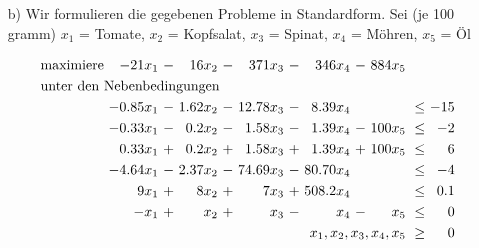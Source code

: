 \documentclass [a4paper,11pt]{article}
\begin{document}
\begin{enumerate}
\begin{enumerate}
				\item[b)]
					Wir formulieren die gegebenen Probleme in Standardform.
                    Sei (je 100 gramm) $x_1$ = Tomate, $x_2$ = Kopfsalat, $x_3$ = Spinat, $x_4$ = Möhren, $x_5$ = Öl
                            


                    \begin{align*}
                    \begin{alignedat}{7}
                    & \text{maximiere } & -21x_1 &\ - &\ 16x_2 &\ - &\ 371x_3 &\ - &\ 346x_4 &\ - &\ 884x_5 & & \\
                    & \rlap{unter den Nebenbedingungen} & & & & & & & & & & & \\
                    &&-0.85x_1 &\ - &\ 1.62x_2 &\ - &\ 12.78x_3 &\ - &\  8.39x_4 &    &         &\ \leq &\ -15 \\
                    &&-0.33x_1 &\ - &\  0.2x_2 &\ - &\  1.58x_3 &\ - &\  1.39x_4 &\ - &\ 100x_5 &\ \leq &\  -2 \\
                    && 0.33x_1 &\ + &\  0.2x_2 &\ + &\  1.58x_3 &\ + &\  1.39x_4 &\ + &\ 100x_5 &\ \leq &\   6 \\
                    &&-4.64x_1 &\ - &\ 2.37x_2 &\ - &\ 74.69x_3 &\ - &\ 80.70x_4 &    &         &\ \leq &\  -4 \\
                    &&    9x_1 &\ + &\    8x_2 &\ + &\     7x_3 &\ + &\ 508.2x_4 &    &         &\ \leq &\ 0.1 \\
                    &&    -x_1 &\ + &\     x_2 &\ + &\      x_3 &\ - &\      x_4 &\ - &\    x_5 &\ \leq &\   0 \\
                    && & & & & & & & & \llap{$x_1, x_2, x_3, x_4, x_5$} &\ \geq &\ 0
                    \end{alignedat}
                    \end{align*}
		\end{enumerate}
            
            

    \end{enumerate}
\end{document}
